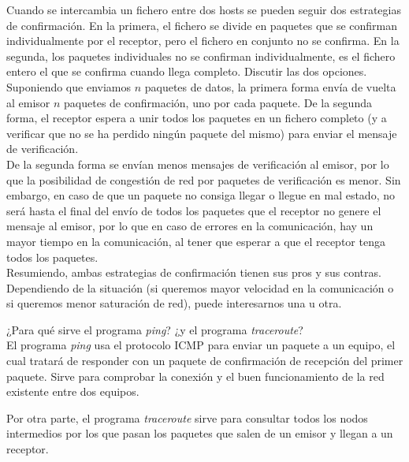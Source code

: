 \begin{ejercicio}
    Cuando se intercambia un fichero entre dos hosts se pueden seguir dos estrategias de confirmación. En la primera, el fichero se divide en paquetes que se confirman individualmente por el receptor, pero el fichero en conjunto no se confirma. En la segunda, los paquetes individuales no se confirman individualmente, es el fichero entero el que se confirma cuando llega completo. Discutir las dos opciones.\\

    Suponiendo que enviamos $n$ paquetes de datos, la primera forma envía de vuelta al emisor $n$ paquetes de confirmación, uno por cada paquete. De la segunda forma, el receptor espera a unir todos los paquetes en un fichero completo (y a verificar que no se ha perdido ningún paquete del mismo) para enviar el mensaje de verificación.\\

    De la segunda forma se envían menos mensajes de verificación al emisor, por lo que la posibilidad de congestión de red por paquetes de verificación es menor. Sin embargo, en caso de que un paquete no consiga llegar o llegue en mal estado, no será hasta el final del envío de todos los paquetes que el receptor no genere el mensaje al emisor, por lo que en caso de errores en la comunicación, hay un mayor tiempo en la comunicación, al tener que esperar a que el receptor tenga todos los paquetes.\\

    Resumiendo, ambas estrategias de confirmación tienen sus pros y sus contras. Dependiendo de la situación (si queremos mayor velocidad en la comunicación o si queremos menor saturación de red), puede interesarnos una u otra.
\end{ejercicio}

\begin{ejercicio}
   ¿Para qué sirve el programa \textit{ping}? ¿y el programa \textit{traceroute}? \\

   El programa \textit{ping} usa el protocolo ICMP para enviar un paquete a un equipo, el cual tratará de responder con un paquete de confirmación de recepción del primer paquete. Sirve para comprobar la conexión y el buen funcionamiento de la red existente entre dos equipos.

   Por otra parte, el programa \textit{traceroute} sirve para consultar todos los nodos intermedios por los que pasan los paquetes que salen de un emisor y llegan a un receptor.
\end{ejercicio}

